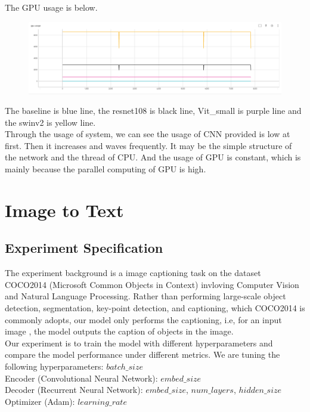 The GPU usage is below.
\begin{figure}[H]
    \centering
    \includegraphics[width=16cm]{Pasted image 20221127163454.png}
\end{figure}

The baseline is blue line, the resnet108 is black line, Vit_small is purple line and the swinv2 is yellow line.\\
Through the usage of system, we can see the usage of CNN provided is low at first. Then it increases and waves frequently. It may be the simple structure of the network and the thread of CPU. And the usage of GPU is constant, which is mainly because the parallel computing of GPU is high.

\section{Image to Text}
\subsection{Experiment Specification}
The experiment background is a image captioning task on the dataset COCO2014 (Microsoft Common Objects in Context) 
invloving Computer Vision and Natural Language Processing. Rather than performing large-scale object detection, segmentation, key-point detection, and captioning, which COCO2014
is commonly adopts, our model only performs the captioning, i.e, for an input image , the model outputs the caption of objects in the image.\\
Our experiment is to train the model with different hyperparameters and compare the model performance under different metrics. We are tuning the following hyperparameters: 
$batch\_size$ \\
Encoder (Convolutional Neural Network): $embed\_size$\\
Decoder (Recurrent Neural Network): $embed\_size$, $num\_layers$, $hidden\_size$\\
Optimizer (Adam): $learning\_rate$

